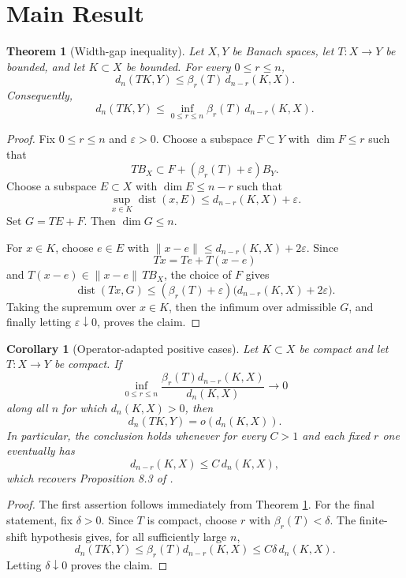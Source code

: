 \documentclass[11pt]{article}
\newtheorem{theorem}{Theorem}
\newtheorem{corollary}{Corollary}
\newcommand{\dist}{\operatorname{dist}}
\begin{document}
\section*{Main Result}

\begin{theorem}[Width-gap inequality]\label{thm:gap}
Let \(X,Y\) be Banach spaces, let \(T:X\to Y\) be bounded, and let
\(K\subset X\) be bounded.  For every \(0\le r\le n\),
\[
d_n(TK,Y)\le \beta_r(T)\,d_{n-r}(K,X).
\]
Consequently,
\[
d_n(TK,Y)\le
\inf_{0\le r\le n}\beta_r(T)\,d_{n-r}(K,X).
\]
\end{theorem}

\begin{proof}
Fix \(0\le r\le n\) and \(\varepsilon>0\).  Choose a subspace
\(F\subset Y\) with \(\dim F\le r\) such that
\[
TB_X\subset F+(\beta_r(T)+\varepsilon)B_Y.
\]
Choose a subspace \(E\subset X\) with \(\dim E\le n-r\) such that
\[
\sup_{x\in K}\dist(x,E)\le d_{n-r}(K,X)+\varepsilon.
\]
Set \(G=TE+F\).  Then \(\dim G\le n\).

For \(x\in K\), choose \(e\in E\) with
\(\|x-e\|\le d_{n-r}(K,X)+2\varepsilon\).  Since
\[
T x=T e+T(x-e)
\]
and \(T(x-e)\in \|x-e\|\,TB_X\), the choice of \(F\) gives
\[
\dist(Tx,G)\le
(\beta_r(T)+\varepsilon)\big(d_{n-r}(K,X)+2\varepsilon\big).
\]
Taking the supremum over \(x\in K\), then the infimum over admissible
\(G\), and finally letting \(\varepsilon\downarrow0\), proves the
claim.
\end{proof}

\begin{corollary}[Operator-adapted positive cases]\label{cor:criterion}
Let \(K\subset X\) be compact and let \(T:X\to Y\) be compact.  If
\[
\inf_{0\le r\le n}
\frac{\beta_r(T)d_{n-r}(K,X)}{d_n(K,X)}
\longrightarrow 0
\]
along all \(n\) for which \(d_n(K,X)>0\), then
\[
d_n(TK,Y)=o(d_n(K,X)).
\]
In particular, the conclusion holds whenever for every \(C>1\) and
each fixed \(r\) one eventually has
\[
d_{n-r}(K,X)\le C\,d_n(K,X),
\]
which recovers Proposition 8.3 of \cite{OO2012}.
\end{corollary}

\begin{proof}
The first assertion follows immediately from Theorem
\ref{thm:gap}.  For the final statement, fix \(\delta>0\).  Since
\(T\) is compact, choose \(r\) with \(\beta_r(T)<\delta\).  The
finite-shift hypothesis gives, for all sufficiently large \(n\),
\[
d_n(TK,Y)\le \beta_r(T)d_{n-r}(K,X)
 \le C\delta\,d_n(K,X).
\]
Letting \(\delta\downarrow0\) proves the claim.
\end{proof}
\end{document}
